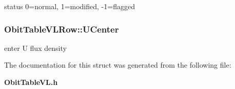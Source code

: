 status 0=normal, 1=modified, -1=flagged 

\subsubsection{ {\bf Obit\-Table\-VLRow::UCenter}}\label{structObitTableVLRow_o13}


enter U flux density 



The documentation for this struct was generated from the following file:\begin{CompactItemize}
\item 
{\bf Obit\-Table\-VL.h}\end{CompactItemize}
